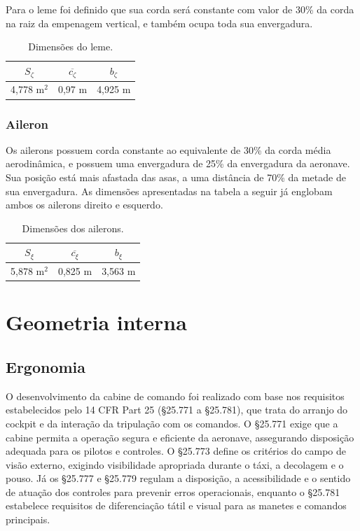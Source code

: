 Para o leme foi definido que sua corda será constante com valor de 30\% da corda na raiz da empenagem vertical, e também ocupa toda sua envergadura.

\begin{table}[H]
    \centering
     \caption{Dimensões do leme.}
    \begin{tabular}{c c c}
    \hline
     $S_{\zeta}$  & $\overline{c_{\zeta}}$ & $b_{\zeta}$  \\
     \hline
     4,778 m$^2$ & 0,97 m & 4,925 m \\
      \hline
    \end{tabular}
    \label{leme_geo}
\end{table}


\subsubsection{Aileron}

Os ailerons possuem corda constante ao equivalente de 30\% da corda média aerodinâmica, e possuem uma envergadura de 25\% da envergadura da aeronave. Sua posição está mais afastada das asas, a uma distância de 70\% da metade de sua envergadura. As dimensões apresentadas na tabela a seguir já englobam ambos os ailerons direito e esquerdo.

\begin{table}[H]
    \centering
     \caption{Dimensões dos ailerons.}
    \begin{tabular}{c c c}
    \hline
     $S_{\xi}$  & $\overline{c_{\xi}}$ & $b_{\xi}$  \\
     \hline
     5,878 m$^2$ & 0,825 m & 3,563 m \\
      \hline
    \end{tabular}
    \label{ailer_geo}
\end{table}


\section{Geometria interna}

\subsection{Ergonomia}
\label{sec:ergonomia}


O desenvolvimento da cabine de comando foi realizado com base nos requisitos estabelecidos pelo 14 CFR Part 25 (\S 25.771 a \S 25.781), que trata do arranjo do cockpit e da interação da tripulação com os comandos. O \S 25.771 exige que a cabine permita a operação segura e eficiente da aeronave, assegurando disposição adequada para os pilotos e controles. O \S 25.773 define os critérios do campo de visão externo, exigindo visibilidade apropriada durante o táxi, a decolagem e o pouso. Já os \S 25.777 e \S 25.779 regulam a disposição, a acessibilidade e o sentido de atuação dos controles para prevenir erros operacionais, enquanto o \S 25.781 estabelece requisitos de diferenciação tátil e visual para as manetes e comandos principais.

